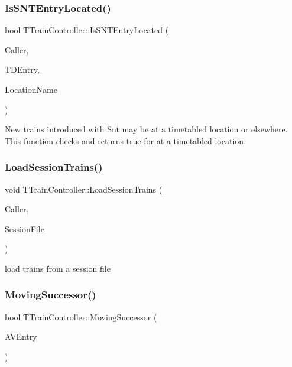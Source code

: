 \subsubsection{\texorpdfstring{Is\+S\+N\+T\+Entry\+Located()}{IsSNTEntryLocated()}}
{\footnotesize\ttfamily bool T\+Train\+Controller\+::\+Is\+S\+N\+T\+Entry\+Located (\begin{DoxyParamCaption}\item[{int}]{Caller,  }\item[{const \mbox{\hyperlink{class_t_train_data_entry}{T\+Train\+Data\+Entry}} \&}]{T\+D\+Entry,  }\item[{Ansi\+String \&}]{Location\+Name }\end{DoxyParamCaption})}

New trains introduced with \textquotesingle{}Snt\textquotesingle{} may be at a timetabled location or elsewhere. This function checks and returns true for at a timetabled location. \mbox{\label{class_t_train_controller_a853ddf9799c9fd7063c81ffa1dc754d7}} 
\subsubsection{\texorpdfstring{Load\+Session\+Trains()}{LoadSessionTrains()}}
{\footnotesize\ttfamily void T\+Train\+Controller\+::\+Load\+Session\+Trains (\begin{DoxyParamCaption}\item[{int}]{Caller,  }\item[{std\+::ifstream \&}]{Session\+File }\end{DoxyParamCaption})}

load trains from a session file \mbox{\label{class_t_train_controller_ae6c929171fa673b87e68694e6f48985d}} 
\subsubsection{\texorpdfstring{Moving\+Successor()}{MovingSuccessor()}}
{\footnotesize\ttfamily bool T\+Train\+Controller\+::\+Moving\+Successor (\begin{DoxyParamCaption}\item[{const \mbox{\hyperlink{class_t_action_vector_entry}{T\+Action\+Vector\+Entry}} \&}]{A\+V\+Entry }\end{DoxyParamCaption})}


